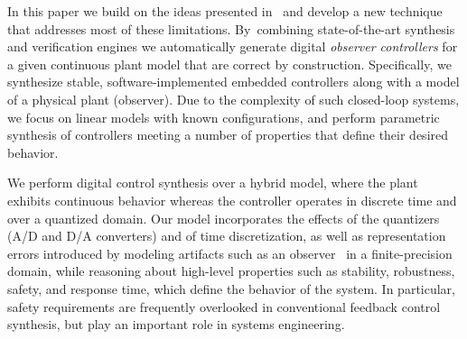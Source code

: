 \documentclass[sigconf]{llncs}
\begin{document}
In this paper we build on the ideas presented in~\cite{abate2017automated}
and develop a new technique that addresses most of these limitations. 
By~combining state-of-the-art synthesis and verification engines we
automatically generate digital \emph{observer controllers} for a given
continuous plant model that are correct by construction.
%
%
Specifically, we synthesize stable, software-implemented embedded
controllers along with a model of a physical plant (observer).  Due to the
complexity of such closed-loop systems, we focus on linear models with known
configurations, and perform parametric synthesis of controllers meeting a
number of properties that define their desired behavior.

We perform digital control synthesis over a hybrid model, where the plant
exhibits continuous behavior whereas the controller operates in discrete
time and over a quantized domain.  Our model incorporates the effects of the
quantizers (A/D and D/A converters) and of time discretization, as well as
representation errors introduced by modeling artifacts such as an
observer~\cite{astrom1997computer} in a finite-precision domain, while
reasoning about high-level properties such as stability, robustness, safety,
and response time, which define the behavior of the system.  In particular,
safety requirements are frequently overlooked in conventional feedback
control synthesis, but play an important role in systems engineering.

\end{document}
